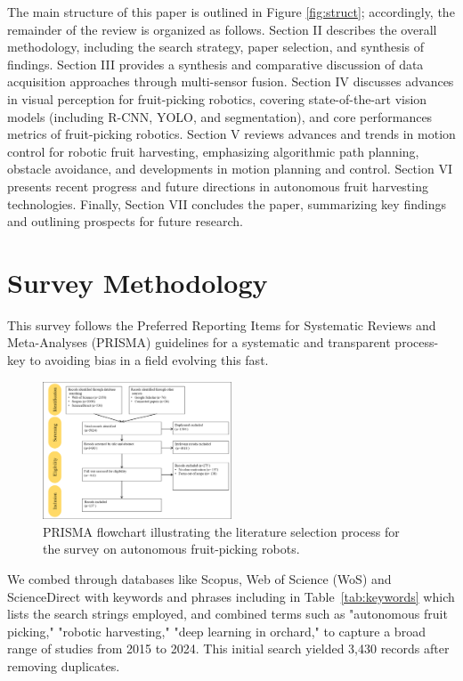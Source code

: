 \documentclass[a4paper,fleqn]{cas-dc}
\begin{document}
The main structure of this paper is outlined in Figure \ref{fig:struct}; accordingly, the remainder of the review is organized as follows. Section II describes the overall methodology, including the search strategy, paper selection, and synthesis of findings. Section III provides a synthesis and comparative discussion of data acquisition approaches through multi-sensor fusion.
Section IV discusses advances in visual perception for fruit-picking robotics, covering state-of-the-art vision models (including R-CNN, YOLO, and segmentation), and core performances metrics of fruit-picking robotics. Section V reviews advances and trends in motion control for robotic fruit harvesting, emphasizing algorithmic path planning, obstacle avoidance, and developments in motion planning and control. Section VI presents recent progress and future directions in autonomous fruit harvesting technologies. Finally, Section VII concludes the paper, summarizing key findings and outlining prospects for future research.



\section{Survey Methodology}
This survey follows the Preferred Reporting Items for Systematic Reviews and Meta-Analyses (PRISMA) guidelines \cite{page2021prisma} for a systematic and transparent process-key to avoiding bias in a field evolving this fast. 

\begin{figure}[h!]
    \centering
    \includegraphics[width=0.5\textwidth]{fig_prisma1.png}
    \caption{ PRISMA flowchart illustrating the literature selection process for the survey on autonomous fruit-picking robots. 
    }
    \label{fig:prisma1}
\end{figure}

We combed through databases like Scopus, Web of Science (WoS) and ScienceDirect with keywords and phrases including in Table~\ref{tab:keywords} which lists the search strings employed, and combined terms such as "autonomous fruit picking," "robotic harvesting," "deep learning in orchard," to capture a broad range of studies from 2015 to 2024. This initial search yielded 3,430 records after removing duplicates.
\end{document}
